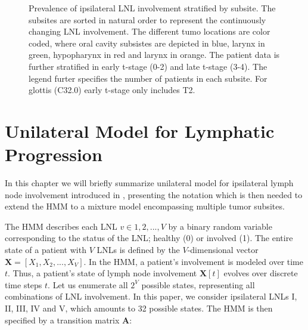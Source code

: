 \documentclass[
  sn-mathphys-num,
]{sn-jnl}
\begin{document}
\begin{figure}


\caption{\label{fig-involvement}Prevalence of ipsilateral LNL
involvement stratified by subsite. The subsites are sorted in natural
order to represent the continuously changing LNL involvement. The
different tumo locations are color coded, where oral cavity subsistes
are depicted in blue, larynx in green, hypopharynx in red and larynx in
orange. The patient data is further stratified in early t-stage (0-2)
and late t-stage (3-4). The legend furter specifies the number of
patients in each subsite. For glottis (C32.0) early t-stage only
includes T2.}

\end{figure}%

\section{Unilateral Model for Lymphatic
Progression}\label{sec-unilateral}

In this chapter we will briefly summarize unilateral model for
ipsilateral lymph node involvement introduced in
\citet{ludwig_hidden_2021}, presenting the notation which is then needed
to extend the HMM to a mixture model encompassing multiple tumor
subsites.

The HMM describes each LNL \(v \in 1, 2, ..., V\) by a binary random
variable corresponding to the status of the LNL; healthy (0) or involved
(1). The entire state of a patient with \(V\) LNLs is defined by the
\(V\)-dimensional vector \(\mathbf{X} = [X_1, X_2, ...,X_V]\). In the
HMM, a patient's involvement is modeled over time \(t\). Thus, a
patient's state of lymph node involvement \(\mathbf{X}[t]\) evolves over
discrete time steps \(t\). Let us enumerate all \(2^V\) possible states,
representing all combinations of LNL involvement. In this paper, we
consider ipsilateral LNLs I, II, III, IV and V, which amounts to 32
possible states. The HMM is then specified by a transition matrix
\(\mathbf{A}\):
\end{document}
